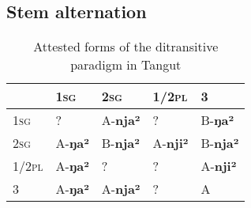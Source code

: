 \documentclass[oneside,a4paper,11pt]{article}
\newcommand{\ipa}[1]{\textbf{\phon#1}} %
\newcommand{\sg}{\textsc{sg}}
\newcommand{\pl}{\textsc{pl}}
\begin{document}
\subsection{Stem alternation}

\begin{table}[H]
\caption{Attested forms of the ditransitive paradigm in Tangut}\centering  \label{tab:paradigm}
\begin{tabular}{lllll}
\toprule
	&	1\sg{}	&	2\sg{}	&	1/2\pl{}	&	3	\\
	\midrule
1\sg{}	&	?	&	A-\ipa{nja²}	&	?	&	 B-\ipa{ŋa²}	\\
2\sg{}	&	A-\ipa{ŋa²}	&	B-\ipa{nja²}	&	A-\ipa{nji²}	&	 B-\ipa{nja²}	\\
1/2\pl{}	&	 A-\ipa{ŋa²}	& ?	&	?	&	A-\ipa{nji²}	\\
3	&	A-\ipa{ŋa²}	&	A-\ipa{nja²}	&	?	&	A 	\\
\bottomrule
\end{tabular}
\end{table}



\end{document}

